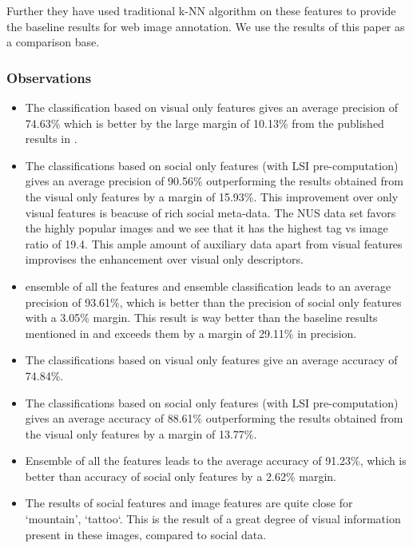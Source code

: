 Further they have used traditional k-NN algorithm  on these features to provide the baseline results for web image annotation. We use the results of this paper as a comparison base. 


\subsubsection*{Observations}

\begin{itemize}
\item The classification based on visual only features gives an  average precision of 74.63\% which is better by the large margin 
of 10.13\% from the published results in \citet*{NUS}.

\item The classifications based on social only features (with LSI pre-computation) gives an average precision of 90.56\% outperforming 
the results obtained from the visual only features by a  margin of 15.93\%. This improvement over only visual features is beacuse of rich social meta-data. The NUS data set favors the highly popular images and we see that it has the highest tag vs image ratio of 19.4. This ample amount of auxiliary data apart from visual features improvises the enhancement over visual only descriptors.

\item ensemble of all the features and ensemble classification leads to an average precision of 93.61\%, which  is better than the precision 
of social only features with a 3.05\% margin. This result is way better than the baseline results mentioned in \citet*{NUS} and exceeds
them by a margin of 29.11\% in precision.

\item The classifications based on visual only features give an average accuracy of 74.84\%.

\item The classifications based on social only features (with LSI 
pre-computation) gives an average accuracy of 88.61\% outperforming 
the results obtained from the visual only features by a margin of 13.77\%.

\item Ensemble of all the features leads 
to the average accuracy of 91.23\%, which is better than accuracy of 
social only features by a 2.62\% margin. 

\item The results of social features and image features are quite close for `mountain', `tattoo`. This is the result of a great degree 
of visual information present in these images, compared to social data.

\end{itemize}


